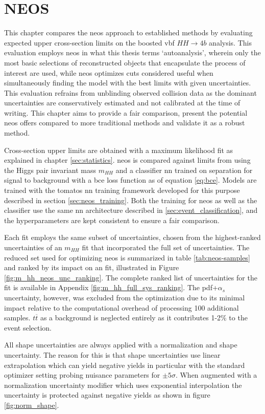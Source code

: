 \chapter{NEOS}
This chapter compares the \ac{neos} approach to established methods by evaluating expected upper cross-section limits on the boosted \ac{vbf} $HH\rightarrow4b$ analysis. This evaluation employs \ac{neos} in what this thesis terms `autoanalysis', wherein only the most basic selections of reconstructed objects that encapsulate the process of interest are used, while \ac{neos} optimizes cuts considered useful when simultaneously finding the model with the best limits with given uncertainties. This evaluation refrains from unblinding observed collision data as the dominant uncertainties are conservatively estimated and not calibrated at the time of writing. This chapter aims to provide a fair comparison, present the potential \ac{neos} offers compared to more traditional methods and validate it as a robust method.

Cross-section upper limits are obtained with a maximum likelihood fit as explained in chapter \ref{sec:statistics}. \ac{neos} is compared against limits from using the Higgs pair invariant mass $m_{HH}$ and a classifier \ac{nn} trained on separation for signal to background with a \ac{bce} loss function as of equation \ref{eq:bce}. Models are trained with the \ac{tomatos} \ac{nn} training framework developed for this purpose \citep{tomatos} described in section \ref{sec:neos_training}. Both the training for \ac{neos} as well as the classifier use the same \ac{nn} architecture described in \ref{sec:event_classification}, and the hyperparameters are kept consistent to ensure a fair comparison.

Each fit employs the same subset of uncertainties, chosen from the highest-ranked uncertainties of an $m_{HH}$ fit that incorporated the full set of uncertainties. The reduced set used for optimizing \ac{neos} is summarized in table \ref{tab:neos-samples} and ranked by its impact on an \mhh fit, illustrated in Figure \ref{fig:m_hh_neos_unc_ranking}. The complete ranked list of uncertainties for the \mhh fit is available in Appendix \ref{fig:m_hh_full_sys_ranking}. The \ac{pdf}+$\alpha_s$ uncertainty, however, was excluded from the optimization due to its minimal impact relative to the computational overhead of processing 100 additional samples. $t\overline{t}$ as a background is neglected entirely as it contributes 1-2\% to the event selection.

All shape uncertainties are always applied with a normalization and shape uncertainty. The reason for this is that shape uncertainties use linear extrapolation which can yield negative yields in particular with the standard optimizer setting probing nuisance parameters for $\pm5\sigma$. When augmented with a normalization uncertainty modifier which uses exponential interpolation the uncertainty is protected against negative yields as shown in figure \ref{fig:norm_shape}.


